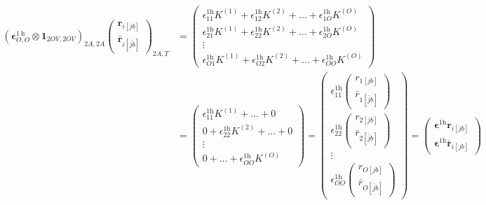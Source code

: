 \begin{align}
    \left(\bm{\epsilon}^{1 \mathrm{~h}}_{O,O} \otimes \bm{1}_{2OV,2OV} \right)_{2A,2A}\begin{pmatrix}
    \bm{r}_{i[jb]} \\
\bm{\bar{r}}_{i[\bar{jb}]}
\end{pmatrix}_{2A,T}
&= \begin{pmatrix}
\epsilon^{1\mathrm{h}}_{11} K^{(1)} + \epsilon^{1\mathrm{h}}_{12} K^{(2)} + \dots + \epsilon^{1\mathrm{h}}_{1O} K^{(O)} \\[1.2em]
\epsilon^{1\mathrm{h}}_{21} K^{(1)} + \epsilon^{1\mathrm{h}}_{22} K^{(2)} + \dots + \epsilon^{1\mathrm{h}}_{2O} K^{(O)} \\[1em]
\vdots \\[6pt]
\epsilon^{1\mathrm{h}}_{O1} K^{(1)} + \epsilon^{1\mathrm{h}}_{O2} K^{(2)} + \dots + \epsilon^{1\mathrm{h}}_{OO} K^{(O)}
\end{pmatrix}\\
& =\begin{pmatrix}
\epsilon^{1\mathrm{h}}_{11} K^{(1)} + \dots +0 \\[1.2em]
0 + \epsilon^{1\mathrm{h}}_{22} K^{(2)} + \dots + 0 \\[1em]
\vdots \\[6pt]
0 + \dots + \epsilon^{1\mathrm{h}}_{OO} K^{(O)}
\end{pmatrix} =\begin{pmatrix}
\epsilon^{1\mathrm{h}}_{11} \begin{pmatrix} r_{1[jb]} \\[6pt]
\bar{r}_{1[\bar{j} b]} \end{pmatrix}\\
\epsilon^{1\mathrm{h}}_{22} \begin{pmatrix} r_{2[jb]} \\[6pt]
\bar{r}_{2[\bar{j} b]} \end{pmatrix}\\
\vdots \\[6pt]
\epsilon^{1\mathrm{h}}_{OO} \begin{pmatrix} r_{O[jb]} \\[6pt]
\bar{r}_{O[\bar{j} b]} \end{pmatrix}
\end{pmatrix} = \begin{pmatrix}
\bm{\epsilon}^{1\mathrm{h}} \bm{r}_{i[jb]} \\[6pt]
\bm{\epsilon}^{1\mathrm{h}} \bar{\bm{r}}_{i[{jb}]}
\end{pmatrix}
\end{align}
